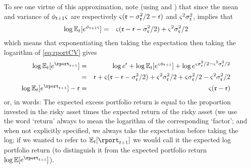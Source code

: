 To see one virtue of this approximation, note (using  and ) that since the mean and variance of $\phi_{t+1} {\varsigma}$ are respectively ${\varsigma}(\mathfrak{r} - \sigma^{2}_{\mathfrak{r}}/2- \mathsf{r})$ and ${\varsigma}^{2} \sigma^{2}_{\mathfrak{r}}$,  implies that
\begin{eqnarray}
 \log \mathbb{E}_{t}[e^{\phi_{t+1} {\varsigma}}] & = & {\varsigma} (\mathfrak{r} - \mathsf{r} - \sigma^{2}_{\mathfrak{r}}/2) + {\varsigma}^{2}\sigma^{2}_{\mathfrak{r}}/2
\end{eqnarray}
which means that exponentiating then taking the expectation then taking the logarithm of \eqref{eq:rportCV} gives
\begin{eqnarray}
   \log \Ex_{t}[e^{\rport_{t+1}}] & = & \log e^{\rfree} + \log \Ex_{t}[e^{\riskyshare \eprem_{t+1}}] + \log e^{\riskyshare\sigma^{2}_{\risky}/2 - \riskyshare^{2}\sigma^{2}_{\risky}/2}
\\ & = &
\rfree + \riskyshare (\risky-\rfree-\sigma^{2}_{\risky}/2)+\riskyshare^{2}\sigma^{2}_{\risky}/2 +\riskyshare \sigma^{2}_{\risky}/2 - \riskyshare^{2}\sigma^{2}_{\risky}/2
\\ \log \Ex_{t}[e^{\rport_{t+1}}] - \rfree & = &  \riskyshare (\risky-\rfree) \label{eq:rportDist}
\end{eqnarray}
or, in words: The expected excess portfolio return is equal to the proportion invested in the risky asset times the expected return of the risky asset (we use the word `return' always to mean the logarithm of the corresponding `factor'; and when not explicitly specified, we always take the expectation before taking the log; if we wanted to refer to $\Ex_{t}[\rport_{t+1}]$ we would call it the expected log portfolio return (to distinguish it from the expected portfolio return $\log \Ex[e^{\rport_{t+1}}]$).

